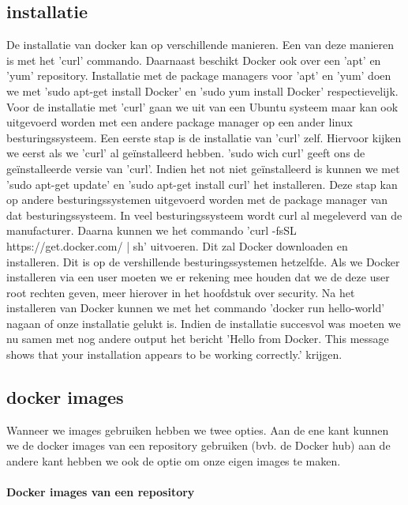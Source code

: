 \subsection{installatie}

De installatie van docker kan op verschillende manieren. Een van deze manieren is met het 'curl' commando. Daarnaast beschikt Docker ook over een 'apt' en 'yum' repository. Installatie met de package managers voor 'apt' en 'yum' doen we met 'sudo apt-get install Docker' en 'sudo yum install Docker' respectievelijk. Voor de installatie met 'curl' gaan we uit van een Ubuntu systeem maar kan ook uitgevoerd worden met een andere package manager op een ander linux besturingssysteem. Een eerste stap is de installatie van 'curl' zelf. Hiervoor kijken we eerst als we 'curl' al geïnstalleerd hebben. 'sudo wich curl' geeft ons de geïnstalleerde versie van 'curl'. Indien het not niet geïnstalleerd is kunnen we met 'sudo apt-get update' en 'sudo apt-get install curl' het installeren. Deze stap kan op andere besturingssystemen uitgevoerd worden met de package manager van dat besturingssysteem. In veel besturingssysteem wordt curl al megeleverd van de manufacturer. Daarna kunnen we het commando 'curl -fsSL https://get.docker.com/ | sh' uitvoeren. Dit zal Docker downloaden en installeren. Dit is op de vershillende besturingssystemen hetzelfde. Als we Docker installeren via een user moeten we er rekening mee houden dat we de deze user root rechten geven, meer hierover in het hoofdstuk over security. Na het installeren van Docker kunnen we met het commando 'docker run hello-world' nagaan of onze installatie gelukt is. Indien de installatie succesvol was moeten we nu samen met nog andere output het bericht 'Hello from Docker. This message shows that your installation appears to be working correctly.' krijgen.


\subsection{docker images}

Wanneer we images gebruiken hebben we twee opties. Aan de ene kant kunnen we de docker images van een repository gebruiken (bvb. de Docker hub) aan de andere kant hebben we ook de optie om onze eigen images te maken. 

\paragraph{Docker images van een repository}~\\

